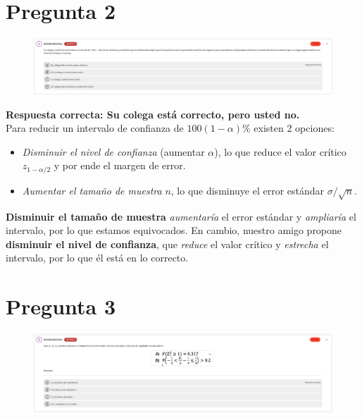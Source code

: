 \documentclass[10pt]{article}
\begin{document}
\section{Pregunta 2}
\begin{figure}[H]
    \centering
    \includegraphics[width=1\textwidth]{images/pregunta2.png}
\end{figure}

\textbf{Respuesta correcta: Su colega está correcto, pero usted no.} \\ 
Para reducir un intervalo de confianza de \(100(1-\alpha)\%\) existen 2 opciones:
\begin{itemize}
    \item \emph{Disminuir el nivel de confianza} (aumentar \(\alpha\)), lo que reduce el valor crítico \(z_{1-\alpha/2}\) y por ende el margen de error.
    \item \emph{Aumentar el tamaño de muestra} \(n\), lo que disminuye el error estándar \(\sigma/\sqrt{n}\).
\end{itemize}
\textbf{Disminuir el tamaño de muestra} \emph{aumentaría} el error estándar y \emph{ampliaría} el intervalo, por lo que estamos equivocados.
En cambio, nuestro amigo propone \textbf{disminuir el nivel de confianza}, que \emph{reduce} el valor crítico y \emph{estrecha} el intervalo, por lo que él está en lo correcto.
\section{Pregunta 3}
\begin{figure}[H]
    \centering
    \includegraphics[width=1\textwidth]{images/pregunta3.png}
\end{figure}
\end{document}
